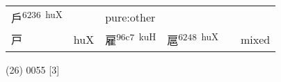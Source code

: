 \documentclass[14pt,a4paper]{scrartcl}
\begin{document}
\begin{longtable}[c]{@{}llllll@{}}
\begin{minipage}[t]{0.14\columnwidth}\raggedright\strut
戶\textsuperscript{6236~huX}
\strut\end{minipage} &
\begin{minipage}[t]{0.14\columnwidth}\raggedright\strut
\strut\end{minipage} &
\begin{minipage}[t]{0.14\columnwidth}\raggedright\strut
pure:other
\strut\end{minipage}\tabularnewline
\begin{minipage}[t]{0.14\columnwidth}\raggedright\strut
戸
\strut\end{minipage} &
\begin{minipage}[t]{0.14\columnwidth}\raggedright\strut
huX
\strut\end{minipage} &
\begin{minipage}[t]{0.14\columnwidth}\raggedright\strut
雇\textsuperscript{96c7~kuH}
\strut\end{minipage} &
\begin{minipage}[t]{0.14\columnwidth}\raggedright\strut
扈\textsuperscript{6248~huX}
\strut\end{minipage} &
\begin{minipage}[t]{0.14\columnwidth}\raggedright\strut
\strut\end{minipage} &
\begin{minipage}[t]{0.14\columnwidth}\raggedright\strut
mixed
\strut\end{minipage}\tabularnewline
\bottomrule
\end{longtable}

(26) 0055 {[}3{]}
\end{document}
